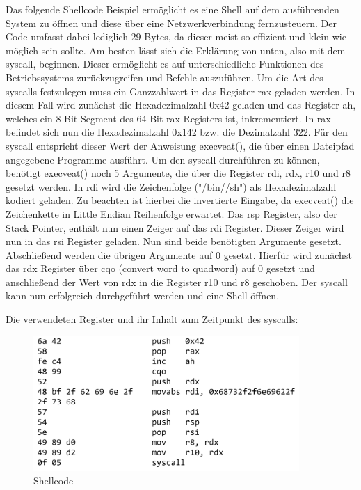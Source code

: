 Das folgende Shellcode Beispiel ermöglicht es eine Shell auf dem ausführenden System zu öffnen und diese über eine Netzwerkverbindung fernzusteuern. 
Der Code umfasst dabei lediglich 29 Bytes, da dieser meist so effizient und klein wie möglich sein sollte. 
Am besten lässt sich die Erklärung von unten, also mit dem syscall, beginnen. 
Dieser ermöglicht es auf unterschiedliche Funktionen des Betriebssystems zurückzugreifen und Befehle auszuführen. 
Um die Art des syscalls festzulegen muss ein Ganzzahlwert in das Register rax geladen werden. 
In diesem Fall wird zunächst die Hexadezimalzahl 0x42 geladen und das Register ah, welches ein 8 Bit Segment des 64 Bit rax Registers ist, inkrementiert. 
In rax befindet sich nun die Hexadezimalzahl 0x142 bzw. die Dezimalzahl 322. Für den syscall entspricht dieser Wert der Anweisung execveat(), 
die über einen Dateipfad angegebene Programme ausführt. Um den syscall durchführen zu können, benötigt execveat() noch 5 Argumente, 
die über die Register rdi, rdx, r10 und r8 gesetzt werden. In rdi wird die Zeichenfolge ("/bin//sh") als Hexadezimalzahl kodiert geladen. 
Zu beachten ist hierbei die invertierte Eingabe, da execveat() die Zeichenkette in Little Endian Reihenfolge erwartet. Das rsp Register, also der Stack Pointer, 
enthält nun einen Zeiger auf das rdi Register. Dieser Zeiger wird nun in das rsi Register geladen. Nun sind beide benötigten Argumente gesetzt. 
Abschließend werden die übrigen Argumente auf 0 gesetzt. Hierfür wird zunächst das rdx Register über cqo (convert word to quadword) auf 0 gesetzt und
anschließend der Wert von rdx in die Register r10 und r8 geschoben. Der syscall kann nun erfolgreich durchgeführt werden und eine Shell öffnen. \cite{syscalls} \cite{execman}

Die verwendeten Register und ihr Inhalt zum Zeitpunkt des syscalls:

\begin{figure}[h]
    \centering
    \includegraphics[width=0.9\textwidth,height=0.75\textheight,keepaspectratio]{images/shellstorm.png}
    \caption{Shellcode}
\end{figure}
\cite{shellstorm}

